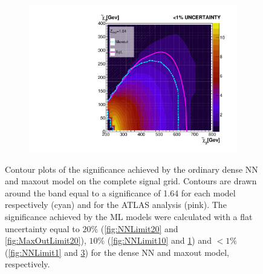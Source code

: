 \begin{figure}[H]
{\begin{subfigure}{.45\textwidth}
        \vspace{-0.75cm}
        \vspace*{-33.1ex}  %
        \begin{center}
        \tiny
        \hspace{-50.5ex}
        \cite{atlas_search_2021}
        \end{center}
        \vspace*{34.1ex}
        \vspace{-1.cm}
        \caption{}
        \label{fig:MaxOutLimit10}
    \end{subfigure}
    \hfill
    \begin{subfigure}{.45\textwidth}
        \includegraphics[width=\textwidth]{Figures/MLResults/NN/SUSY/Comparison/Limits/MaxOutLimit1.pdf}
        \vspace{-0.75cm}
        \vspace*{-33.1ex}  %
        \begin{center}
        \tiny
        \hspace{-50.5ex}
        \cite{atlas_search_2021}
        \end{center}
        \vspace*{34.1ex}
        \vspace{-1.cm}
        \caption{}
        \label{fig:MaxOutLimit1}
    \end{subfigure}
    }
    \caption[Contour plots 
    of the significance achieved by the ordinary dense \acs{NN} and maxout model on the complete signal grid. Contours are drawn 
    around the band equal to a significance of 1.64 for each model respectively (cyan) and for the \acs{ATLAS} analysis (pink).]{Contour plots 
    of the significance achieved by the ordinary dense \acs{NN} and maxout model on the complete signal grid. Contours are drawn 
    around the band equal to a significance of 1.64 for each model respectively (cyan) and for the \acs{ATLAS} analysis \cite{atlas_search_2021} (pink). The 
    significance achieved by the \acs{ML} models were calculated with a flat uncertainty equal to $20\%$ (\ref{fig:NNLimit20} and \ref{fig:MaxOutLimit20}),
    $10\%$ (\ref{fig:NNLimit10} and \ref{fig:MaxOutLimit10}) and $<1\%$ (\ref{fig:NNLimit1} and \ref{fig:MaxOutLimit1}) for the dense \acs{NN} and maxout model,
    respectively.}
\end{figure}